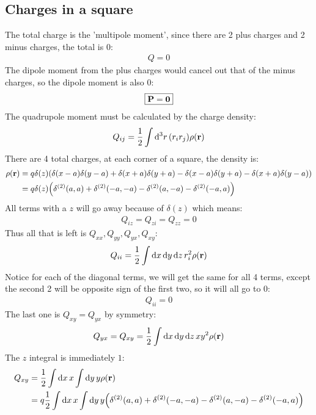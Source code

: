 \documentclass[12pt]{article}
\begin{document}
\subsection{Charges in a square}
The total charge is the 'multipole moment', since there are 2 plus charges and 2 minus charges, the total is $0$:
\begin{align}
  \boxed{Q=0}
\end{align}
The dipole moment from the plus charges would cancel out that of the minus charges, so the dipole moment is also $0$:
\begin{align}
  \boxed{\vb{P}=\bm{0}}
\end{align}
The quadrupole moment must be calculated by the charge density:
\begin{align*}
  Q_{ij}=\frac12\int\dd[3]{r}\qty(r_ir_j)\rho(\vb{r})
\end{align*}
There are 4 total charges, at each corner of a square, the density is:
\begin{align*}
  \rho(\vb{r})&=q\delta(z)(\delta(x-a)\delta(y-a)+\delta(x+a)\delta(y+a)
  -\delta(x-a)\delta(y+a)-\delta(x+a)\delta(y-a))\\
  &=q\delta(z)\qty(
  \delta^{(2)}(a,a)+
  \delta^{(2)}(-a,-a)-
  \delta^{(2)}(a,-a)-
  \delta^{(2)}(-a,a))
\end{align*}
All terms with a $z$ will go away because of $\delta(z)$ which means:
\begin{align*}
  Q_{iz}=Q_{zi}=Q_{zz}=0
\end{align*}
Thus all that is left is $Q_{xx},Q_{yy},Q_{yx},Q_{xy}$:
\begin{align*}
  Q_{ii}=\frac12\int\dd{x}\dd{y}\dd{z}r_i^2\rho(\vb{r})
\end{align*}
Notice for each of the diagonal terms, we will get the same for all 4 terms, except the second 2 will be opposite sign of the first two, so it will all go to $0$:
\begin{align*}
  Q_{ii}=0
\end{align*}
The last one is $Q_{xy}=Q_{yx}$ by symmetry:
\begin{align*}
  Q_{yx}=Q_{xy}=\frac12\int\dd{x}\dd{y}\dd{z}xy^2\rho(\vb{r})
\end{align*}
The $z$ integral is immediately $1$:
\begin{align*}
  Q_{xy}&=\frac12\int\dd{x}x\int\dd{y}y\rho(\vb{r})\\
  &=q\frac12\int\dd{x}x\int\dd{y}y\qty(\delta^{(2)}(a,a)+
  \delta^{(2)}(-a,-a)-
  \delta^{(2)}(a,-a)-
  \delta^{(2)}(-a,a))
\end{align*}
\end{document}
